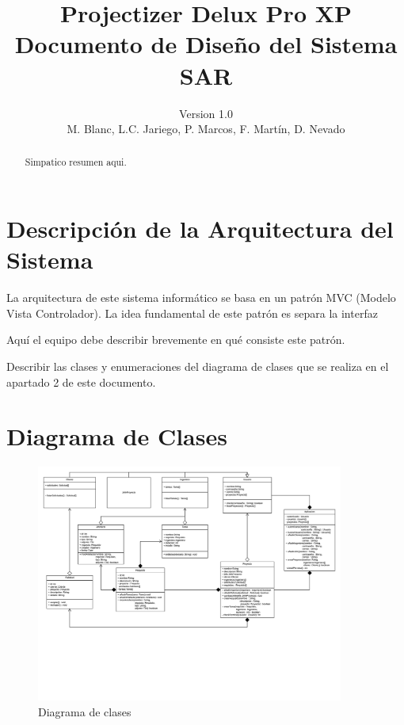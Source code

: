 \documentclass[a4paper, spanish]{article}
\title{Projectizer Delux Pro XP \\ Documento de Diseño del Sistema SAR}
\author{Version 1.0 \\ M. Blanc, L.C. Jariego, P. Marcos, F. Martín, D. Nevado}
\begin{document}
\maketitle
\begin{abstract}
Simpatico resumen aqui.
\end{abstract}
\vspace{\fill}
\tableofcontents
\let\oldsection\section\renewcommand\section{\clearpage\oldsection}

\section{Descripción de la Arquitectura del Sistema}
La arquitectura de este sistema informático se basa en un patrón MVC (Modelo Vista Controlador). La idea fundamental de este patrón es separa la interfaz

Aquí el equipo debe describir brevemente en qué consiste este patrón.
 
Describir las clases y enumeraciones del diagrama de clases que se realiza en el apartado 2 de este documento.

\section{Diagrama de Clases}
\begin{figure}[h!]
\centering
\includegraphics[width=0.9\textwidth]{diagramas/diagrama-clases.png}
\caption{Diagrama de clases}
\end{figure}
\end{document}
